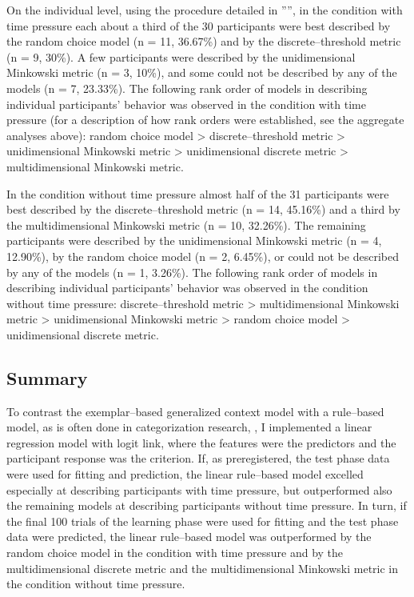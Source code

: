 \documentclass[a4paper,man,natbib]{apa6}
\begin{document}
On the individual level, using the procedure detailed in '''', in the condition with time pressure each about a third of the 30 participants were best described by the random choice model (n = 11, 36.67\%) and by the discrete--threshold metric (n = 9, 30\%). A few participants were described by the unidimensional Minkowski metric (n = 3, 10\%), and some could not be described by any of the models (n = 7, 23.33\%). The following rank order of models in describing individual participants' behavior was observed in the condition with time pressure (for a description of how rank orders were established, see the aggregate analyses above): random choice model > discrete--threshold metric > unidimensional Minkowski metric > unidimensional discrete metric > multidimensional Minkowski metric. 

In the condition without time pressure almost half of the 31 participants were best described by the discrete--threshold metric (n = 14, 45.16\%) and a third by the multidimensional Minkowski metric (n = 10, 32.26\%). The remaining participants were described by the unidimensional Minkowski metric (n = 4, 12.90\%), by the random choice model (n = 2, 6.45\%), or could not be described by any of the models (n = 1, 3.26\%). The following rank order of models in describing individual participants' behavior was observed in the condition without time pressure: discrete--threshold metric > multidimensional Minkowski metric > unidimensional Minkowski metric > random choice model > unidimensional discrete metric.

\subsection{Summary}
To contrast the exemplar--based generalized context model with a rule--based model, as is often done in categorization research, \citep{restle1962selection, tom1968attention, rouder2006comparing}, I implemented a linear regression model with logit link, where the features were the predictors and the participant response was the criterion. 
If, as preregistered, the test phase data were used for fitting and prediction, the linear rule--based model excelled especially at describing participants with time pressure, but outperformed also the remaining models at describing participants without time pressure. In turn, if the final 100 trials of the learning phase were used for fitting and the test phase data were predicted, the linear rule--based model was outperformed by the random choice model in the condition with time pressure and by the multidimensional discrete metric and the multidimensional Minkowski metric in the condition without time pressure.
\end{document}
